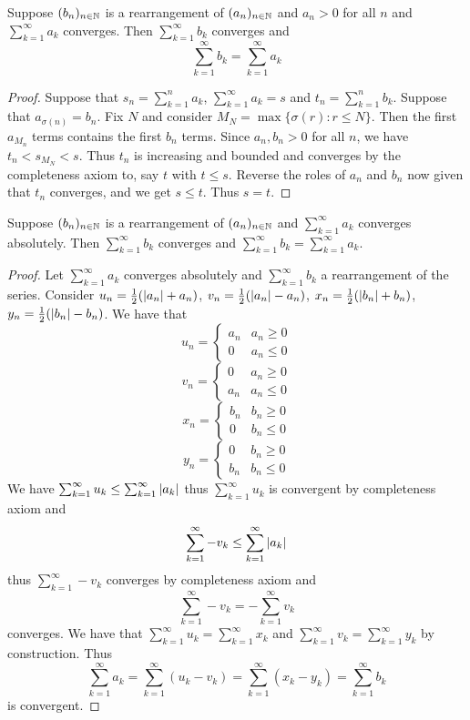 \documentclass[a4paper]{article}
\begin{document}
\begin{thm}{}{} Suppose $(b_n)_{n\in\mathbb{N}}$ is a rearrangement of $(a_n)_{n\in\mathbb{N}}$ and $a_n>0$ for all $n$ and $\sum_{k=1}^{\infty}a_k$ converges. Then $\sum_{k=1}^{\infty}b_k$ converges and $$\sum_{k=1}^{\infty}b_k=\sum_{k=1}^{\infty}a_k$$ \tcbline
\begin{proof} Suppose that $s_n=\sum_{k=1}^{n}a_k$, $\sum_{k=1}^{\infty}a_k=s$ and $t_n=\sum_{k=1}^{n}b_k$. Suppose that $a_{\sigma(n)}=b_n$. Fix $N$ and consider $M_N=\max\{\sigma(r):r\leq N\}$. Then the first $a_{M_n}$ terms contains the first $b_n$ terms. Since $a_n,b_n>0$ for all $n$, we have $t_n<s_{M_N}<s$. Thus $t_n$ is increasing and bounded and converges by the completeness axiom to, say $t$ with $t\leq s$. Reverse the roles of $a_n$ and $b_n$ now given that $t_n$ converges, and we get $s\leq t$. Thus $s=t$. 
\end{proof}
\end{thm}

\begin{thm}{}{} Suppose $(b_n)_{n\in\mathbb{N}}$ is a rearrangement of $(a_n)_{n\in\mathbb{N}}$ and $\sum_{k=1}^{\infty}a_k$ converges absolutely. Then $\sum_{k=1}^{\infty}b_k$ converges and $\sum_{k=1}^{\infty}b_k=\sum_{k=1}^{\infty}a_k$. \tcbline
\begin{proof}
Let $\sum_{k=1}^{\infty}a_k$ converges absolutely and $\sum_{k=1}^{\infty}b_k$ a rearrangement of the series. Consider $u_n=\frac{1}{2}(\abs{a_n}+a_n)$, $v_n=\frac{1}{2}(\abs{a_n}-a_n)$, $x_n=\frac{1}{2}(\abs{b_n}+b_n)$, $y_n=\frac{1}{2}(\abs{b_n}-b_n)$. We have that $$u_n=\begin{cases}
a_n & a_n\geq0\\
0 & a_n\leq 0
\end{cases}$$ $$v_n=\begin{cases}
0 & a_n\geq0\\
a_n & a_n\leq 0
\end{cases}$$ $$x_n=\begin{cases}
b_n & b_n\geq0\\
0 & b_n\leq 0
\end{cases}$$ $$y_n=\begin{cases}
0 & b_n\geq0\\
b_n & b_n\leq 0
\end{cases}$$
We have $\sum_{k=1}^{\infty}u_k\leq\sum_{k=1}^{\infty}\abs{a_k}$ thus $\sum_{k=1}^{\infty}u_k$ is convergent by completeness axiom and $$\sum_{k=1}^{\infty}-v_k\leq\sum_{k=1}^{\infty}\abs{a_k}$$ thus $\sum_{k=1}^{\infty}-v_k$ converges by completeness axiom and $$\sum_{k=1}^{\infty}-v_k=-\sum_{k=1}^{\infty}v_k$$ converges. We have that $\sum_{k=1}^{\infty} u_k=\sum_{k=1}^{\infty} x_k$ and $\sum_{k=1}^{\infty} v_k=\sum_{k=1}^{\infty} y_k$ by construction. Thus $$\sum_{k=1}^{\infty} a_k=\sum_{k=1}^{\infty}(u_k-v_k)=\sum_{k=1}^{\infty}(x_k-y_k)=\sum_{k=1}^{\infty} b_k$$ is convergent. 
\end{proof}
\end{thm}
\end{document}
